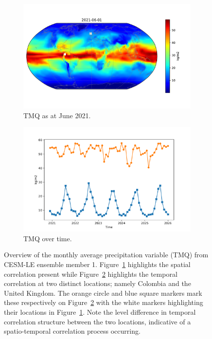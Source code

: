 \begin{figure}[htbp!] 
	\centering
	\begin{subfigure}[b]{0.45\textwidth}
		\includegraphics[width=\textwidth]{TMQ_example}
		\caption{TMQ as at June 2021.}
		\label{fig:precip_june}   
	\end{subfigure}             
	\begin{subfigure}[b]{0.45\textwidth}
		\includegraphics[width=\textwidth]{TMQ_example_temp}
		\caption{TMQ over time.}
		\label{fig:precip_temp}
	\end{subfigure}             
	\caption[Overview of the Precipitation variable from the CESM-LE dataset.]{Overview of the monthly average precipitation variable (TMQ) from CESM-LE ensemble member 1. Figure~\ref{fig:precip_june} highlights the spatial correlation present while Figure~\ref{fig:precip_temp} highlights the temporal correlation at two distinct locations; namely Colombia and the United Kingdom. The orange circle and blue square markers mark these respectively on Figure~\ref{fig:precip_temp} with the white markers highlighting their locations in Figure~\ref{fig:precip_june}. Note the level difference in temporal correlation structure between the two locations, indicative of a spatio-temporal correlation process occurring.}
	\label{fig:precip_overview}
\end{figure}

